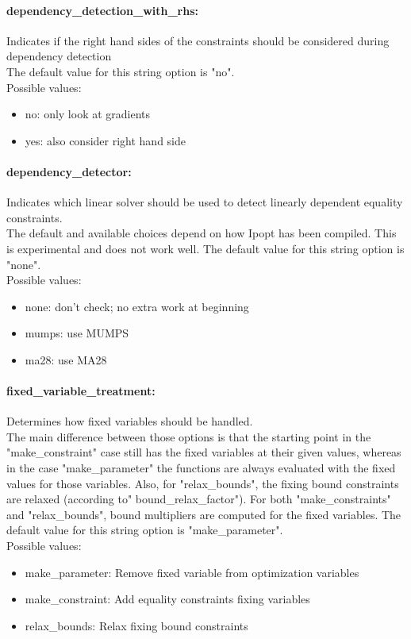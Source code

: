 \paragraph{dependency\_detection\_with\_rhs:}\label{sec:dependency_detection_with_rhs} Indicates if the right hand sides of the constraints should be considered during dependency detection $\;$ \\
The default value for this string option is "no".
\\ 
Possible values:
\begin{itemize}
   \item no: only look at gradients
   \item yes: also consider right hand side
\end{itemize}

\paragraph{dependency\_detector:}\label{sec:dependency_detector} Indicates which linear solver should be used to detect linearly dependent equality constraints. $\;$ \\
 The default and available choices depend on how
Ipopt has been compiled.  This is experimental
and does not work well.
The default value for this string option is "none".
\\ 
Possible values:
\begin{itemize}
   \item none: don't check; no extra work at beginning
   \item mumps: use MUMPS
   \item ma28: use MA28
\end{itemize}

\paragraph{fixed\_variable\_treatment:}\label{sec:fixed_variable_treatment} Determines how fixed variables should be handled. $\;$ \\
 The main difference between those options is that
the starting point in the "make\_constraint" case
still has the fixed variables at their given
values, whereas in the case "make\_parameter" the
functions are always evaluated with the fixed
values for those variables.  Also, for
"relax\_bounds", the fixing bound constraints are
relaxed (according to" bound\_relax\_factor").
For both "make\_constraints" and "relax\_bounds",
bound multipliers are computed for the fixed
variables.
The default value for this string option is "make\_parameter".
\\ 
Possible values:
\begin{itemize}
   \item make\_parameter: Remove fixed variable from optimization
variables
   \item make\_constraint: Add equality constraints fixing variables
   \item relax\_bounds: Relax fixing bound constraints
\end{itemize}

